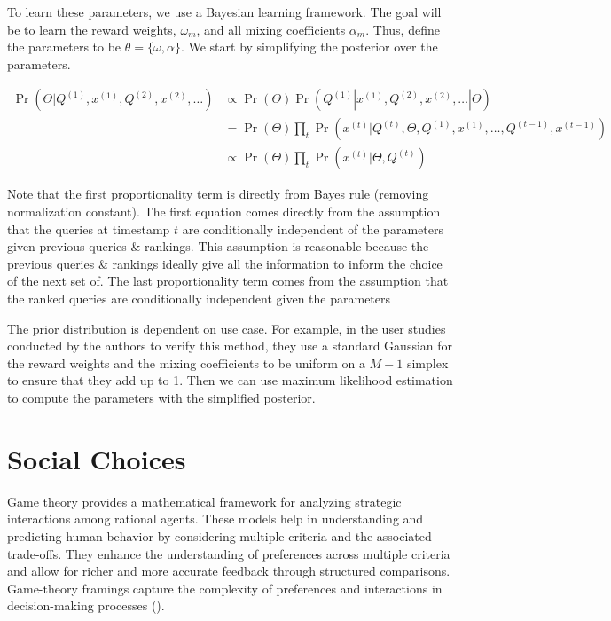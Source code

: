 \documentclass[
  letterpaper,
  numbers=noenddot,
  DIV=11,
  oneside]{scrreprt}
\theoremstyle{remark}
\begin{document}
To learn these parameters, we use a Bayesian learning framework. The
goal will be to learn the reward weights, \(\omega_m\), and all mixing
coefficients \(\alpha_m\). Thus, define the parameters to be
\(\theta = \{\omega, \alpha\}\). We start by simplifying the posterior
over the parameters.

\[\begin{aligned}
\Pr(\Theta | Q^{(1)}, x^{(1)}, Q^{(2)}, x^{(2)}, \ldots) & \propto \Pr(\Theta) \Pr(Q^{(1)} | x^{(1)}, Q^{(2)}, x^{(2)}, \ldots | \Theta) \\
& = \Pr(\Theta) \prod_t \Pr(x^{(t)} | Q^{(t)}, \Theta, Q^{(1)}, x^{(1)}, \ldots, Q^{(t-1)}, x^{(t-1)}) \\
& \propto \Pr(\Theta) \prod_t \Pr(x^{(t)} | \Theta, Q^{(t)})
\end{aligned}\]

Note that the first proportionality term is directly from Bayes rule
(removing normalization constant). The first equation comes directly
from the assumption that the queries at timestamp \(t\) are
conditionally independent of the parameters given previous queries \&
rankings. This assumption is reasonable because the previous queries \&
rankings ideally give all the information to inform the choice of the
next set of. The last proportionality term comes from the assumption
that the ranked queries are conditionally independent given the
parameters

The prior distribution is dependent on use case. For example, in the
user studies conducted by the authors to verify this method, they use a
standard Gaussian for the reward weights and the mixing coefficients to
be uniform on a \(M - 1\) simplex to ensure that they add up to 1. Then
we can use maximum likelihood estimation to compute the parameters with
the simplified posterior.

\section{Social Choices}\label{social-choices}

Game theory provides a mathematical framework for analyzing strategic
interactions among rational agents. These models help in understanding
and predicting human behavior by considering multiple criteria and the
associated trade-offs. They enhance the understanding of preferences
across multiple criteria and allow for richer and more accurate feedback
through structured comparisons. Game-theory framings capture the
complexity of preferences and interactions in decision-making processes
().
\end{document}
